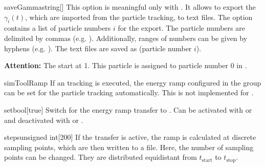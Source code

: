 \documentclass[a4paper]{scrartcl}
\begin{document}
\begin{configdoc}{saveGamma}{string}{}[]
  This option is meaningful only with  . It
  allows to export the $\gamma_i(t)$, which are imported from the particle tracking, to
  text files. The option contains a list of particle numbers $i$ for the export.
  The particle numbers are delimited by commas (e.g. ). Additionally,
  ranges of numbers can be given by hyphens (e.g. ). The text files are
  saved as  (particle number $i$).

  \textbf{Attention:} The \ele {} start at 1. This particle is
  assigned to particle number 0 in \polem.
\end{configdoc}

\begin{configdocgroup}{simToolRamp}
  If an \ele tracking is executed, the energy ramp configured in the group
   can be set for the particle tracking automatically. This is
  not implemented for \madx.

  \begin{configdoc}{set}{bool}{}[true]
    Switch for the energy ramp transfer to \ele. Can be activated with  or
     and deactivated with  or .
  \end{configdoc}

  \begin{configdoc}{steps}{unsigned int}{}[200]
    If the transfer is active, the ramp is calculated at discrete sampling points, which
    are then written to a \sdds file. Here, the number of sampling points can be changed.
    They are distributed equidistant from $t_\text{start}$ to $t_\text{stop}$.
  \end{configdoc}
\end{configdocgroup}
\end{document}
